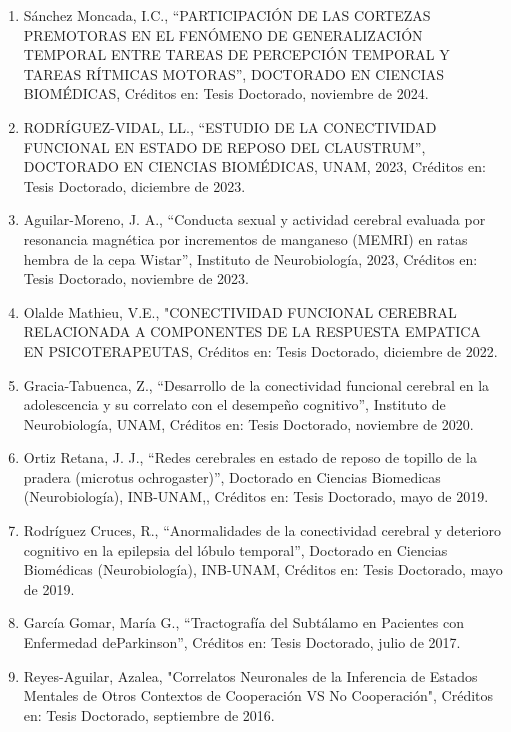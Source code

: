 \documentclass[12pt]{article}
\begin{document}
\begin{enumerate}
\item Sánchez Moncada, I.C., “PARTICIPACIÓN DE LAS CORTEZAS PREMOTORAS EN EL FENÓMENO DE GENERALIZACIÓN TEMPORAL ENTRE TAREAS DE 
PERCEPCIÓN TEMPORAL Y TAREAS RÍTMICAS MOTORAS”, DOCTORADO EN CIENCIAS BIOMÉDICAS, Créditos en: Tesis Doctorado, noviembre de 2024.

\item RODRÍGUEZ-VIDAL, LL., “ESTUDIO DE LA CONECTIVIDAD FUNCIONAL EN ESTADO DE REPOSO DEL CLAUSTRUM”, DOCTORADO EN CIENCIAS BIOMÉDICAS, 
UNAM, 2023, Créditos en: Tesis Doctorado, diciembre de 2023.

\item Aguilar-Moreno, J. A., “Conducta sexual y actividad cerebral evaluada por resonancia magnética por incrementos de manganeso 
(MEMRI) 
en ratas hembra de la cepa Wistar”, Instituto de Neurobiología, 2023, Créditos en: Tesis Doctorado, noviembre de 2023.

\item Olalde Mathieu, V.E., "CONECTIVIDAD FUNCIONAL CEREBRAL RELACIONADA A COMPONENTES DE LA RESPUESTA EMPATICA EN PSICOTERAPEUTAS, 
Créditos en: Tesis Doctorado, diciembre de 2022.

\item Gracia-Tabuenca, Z., “Desarrollo de la conectividad funcional cerebral en la adolescencia y su correlato con el 
desempeño cognitivo”, Instituto de Neurobiología, UNAM, Créditos en: Tesis Doctorado, noviembre de 2020.

\item Ortiz Retana, J. J., “Redes cerebrales en estado de reposo de topillo de la pradera (microtus ochrogaster)”, Doctorado en 
Ciencias 
Biomedicas (Neurobiología), INB-UNAM,, Créditos en: Tesis Doctorado, mayo de 2019.

\item Rodríguez Cruces, R., “Anormalidades de la conectividad cerebral y deterioro cognitivo en la epilepsia del lóbulo temporal”, 
Doctorado en Ciencias Biomédicas (Neurobiología), INB-UNAM, Créditos en: Tesis Doctorado, mayo de 2019.

\item García Gomar, María G., “Tractografía del Subtálamo en Pacientes con Enfermedad deParkinson”, Créditos en: Tesis Doctorado, julio 
de 
2017.

\item Reyes-Aguilar, Azalea, "Correlatos Neuronales de la Inferencia de Estados Mentales de Otros Contextos de Cooperación VS No 
Cooperación", Créditos en: Tesis Doctorado, septiembre de 2016.


\end{enumerate}
\end{document}
